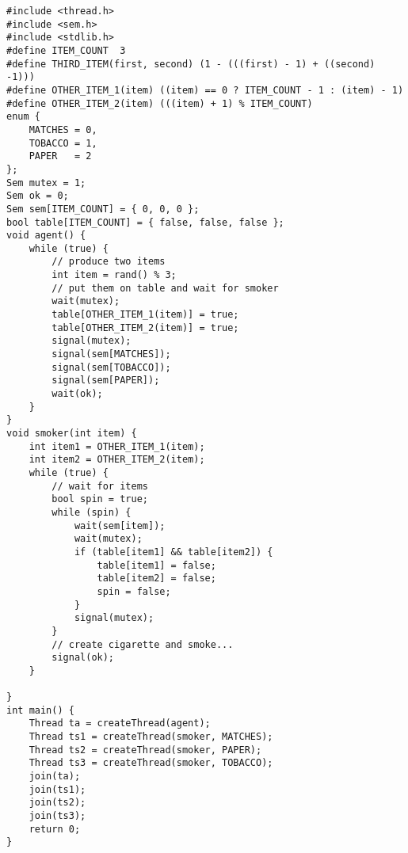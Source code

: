 \begin{lstlisting}
#include <thread.h>
#include <sem.h>
#include <stdlib.h>
#define ITEM_COUNT  3
#define THIRD_ITEM(first, second) (1 - (((first) - 1) + ((second) -1)))
#define OTHER_ITEM_1(item) ((item) == 0 ? ITEM_COUNT - 1 : (item) - 1)
#define OTHER_ITEM_2(item) (((item) + 1) % ITEM_COUNT) 
enum {
    MATCHES = 0,
    TOBACCO = 1,
    PAPER   = 2
};
Sem mutex = 1;
Sem ok = 0;
Sem sem[ITEM_COUNT] = { 0, 0, 0 };
bool table[ITEM_COUNT] = { false, false, false };
void agent() {
    while (true) {
        // produce two items
        int item = rand() % 3;
        // put them on table and wait for smoker
        wait(mutex);
        table[OTHER_ITEM_1(item)] = true;
        table[OTHER_ITEM_2(item)] = true;
        signal(mutex);
        signal(sem[MATCHES]);
        signal(sem[TOBACCO]);
        signal(sem[PAPER]);
        wait(ok);
    }
}
void smoker(int item) {
    int item1 = OTHER_ITEM_1(item);
    int item2 = OTHER_ITEM_2(item);
    while (true) {
        // wait for items
        bool spin = true;
        while (spin) {
            wait(sem[item]);
            wait(mutex);
            if (table[item1] && table[item2]) {
                table[item1] = false;
                table[item2] = false;
                spin = false;
            }
            signal(mutex);
        }
        // create cigarette and smoke...
        signal(ok);
    }
    
}
int main() {
    Thread ta = createThread(agent);
    Thread ts1 = createThread(smoker, MATCHES);
    Thread ts2 = createThread(smoker, PAPER);
    Thread ts3 = createThread(smoker, TOBACCO);
    join(ta);
    join(ts1);
    join(ts2);
    join(ts3);
    return 0;
}
\end{lstlisting}